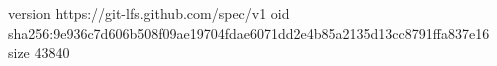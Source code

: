 version https://git-lfs.github.com/spec/v1
oid sha256:9e936c7d606b508f09ae19704fdae6071dd2e4b85a2135d13cc8791ffa837e16
size 43840
